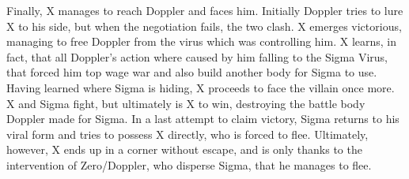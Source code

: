 Finally, X manages to reach Doppler and faces him. Initially Doppler tries to lure X to his side, but when the negotiation fails, the two clash. X emerges victorious, managing to free Doppler from the virus which was controlling him. X learns, in fact, that all Doppler's action where caused by him falling to the Sigma Virus, that forced him top wage war and also build another body for Sigma to use. Having learned where Sigma is hiding, X proceeds to face the villain once more. X and Sigma fight, but ultimately is X to win, destroying the battle body Doppler made for Sigma. In a last attempt to claim victory, Sigma returns to his viral form and tries to possess X directly, who is forced to flee. Ultimately, however, X ends up in a corner without escape, and is only thanks to the intervention of Zero/Doppler, who disperse Sigma, that he manages to flee.

